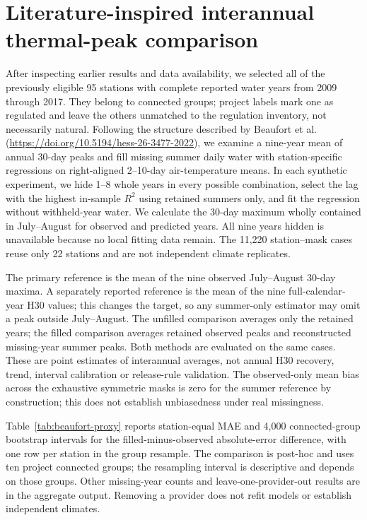 \section{Literature-inspired interannual thermal-peak comparison}
After inspecting earlier results and data availability, we selected all \BFStations{} of the previously eligible 95 stations with complete reported water years from 2009 through 2017. They belong to \BFGroups{} connected groups; project labels mark one as regulated and leave the others unmatched to the regulation inventory, not necessarily natural. Following the structure described by Beaufort et al. (\url{https://doi.org/10.5194/hess-26-3477-2022}), we examine a nine-year mean of annual 30-day peaks and fill missing summer daily water with station-specific regressions on right-aligned 2--10-day air-temperature means. In each synthetic experiment, we hide 1--8 whole years in every possible combination, select the lag with the highest in-sample $R^2$ using retained summers only, and fit the regression without withheld-year water. We calculate the 30-day maximum wholly contained in July--August for observed and predicted years. All nine years hidden is unavailable because no local fitting data remain. The 11,220 station--mask cases reuse only 22 stations and are not independent climate replicates.

The primary reference is the mean of the nine observed July--August 30-day maxima. A separately reported reference is the mean of the nine full-calendar-year H30 values; this changes the target, so any summer-only estimator may omit a peak outside July--August. The unfilled comparison averages only the retained years; the filled comparison averages retained observed peaks and reconstructed missing-year summer peaks. Both methods are evaluated on the same cases. These are point estimates of interannual averages, not annual H30 recovery, trend, interval calibration or release-rule validation. The observed-only mean bias across the exhaustive symmetric masks is zero for the summer reference by construction; this does not establish unbiasedness under real missingness.

Table~\ref{tab:beaufort-proxy} reports station-equal MAE and 4,000 connected-group bootstrap intervals for the filled-minus-observed absolute-error difference, with one row per station in the group resample. The comparison is post-hoc and uses ten project connected groups; the resampling interval is descriptive and depends on those groups. Other missing-year counts and leave-one-provider-out results are in the aggregate output. Removing a provider does not refit models or establish independent climates.

